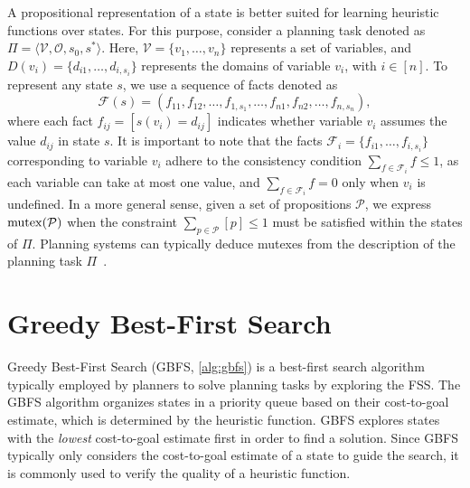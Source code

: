 \documentclass[ppgc,diss,english]{iiufrgs}
\begin{document}
A propositional representation of a state is better suited for learning heuristic functions over states. For this purpose, consider a planning task denoted as $\Pi=\langle\mathcal{V},\mathcal{O},s_0,s^*\rangle$. Here, $\mathcal{V}=\{v_1,\ldots,v_n\}$ represents a set of variables, and $D(v_i)=\{d_{i1},\ldots,d_{i,s_i}\}$ represents the domains of variable $v_i$, with $i\in[n]$. To represent any state $s$, we use a sequence of facts denoted as
$$\mathcal{F}(s)=(f_{11},f_{12},\ldots,f_{1,s_1},\ldots,f_{n1},f_{n2},\ldots,f_{n,s_n}),$$ where each fact $f_{ij}=[s(v_i)=d_{ij}]$ indicates whether variable $v_i$ assumes the value $d_{ij}$ in state $s$. It is important to note that the facts $\mathcal{F}_i=\{f_{i1},\ldots,f_{i,s_i}\}$ corresponding to variable $v_i$ adhere to the consistency condition $\sum_{f\in \mathcal{F}_i} f\leq 1$, as each variable can take at most one value, and $\sum_{f\in \mathcal{F}_i} f=0$ only when $v_i$ is undefined. In a more general sense, given a set of propositions $\mathcal{P}$, we express $\operatorname{mutex}(\mathcal{P})$ when the constraint $\sum_{p\in \mathcal{P}} [p]\leq 1$ must be satisfied within the states of $\Pi$. Planning systems can typically deduce mutexes from the description of the planning task $\Pi$~\cite{Helmert/2009}.

\section{Greedy Best-First Search}
Greedy Best-First Search (GBFS, \cref{alg:gbfs}) is a best-first search algorithm typically employed by planners to solve planning tasks by exploring the FSS. The GBFS algorithm organizes states in a priority queue based on their cost-to-goal estimate, which is determined by the heuristic function. GBFS explores states with the \emph{lowest} cost-to-goal estimate first in order to find a solution. Since GBFS typically only considers the cost-to-goal estimate of a state to guide the search, it is commonly used to verify the quality of a heuristic function.
\end{document}

